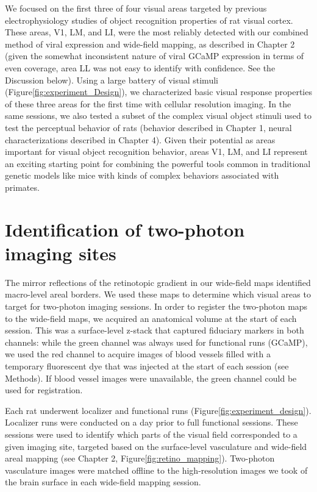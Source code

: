 We focused on the first three of four visual areas targeted by previous electrophysiology studies of object recognition properties of rat visual cortex. These areas, V1, LM, and LI, were the most reliably detected with our combined method of viral expression and wide-field mapping, as described in Chapter 2 (given the somewhat inconsistent nature of viral GCaMP expression in terms of even coverage, area LL was not easy to identify with confidence. See the Discussion below). Using a large battery of visual stimuli (Figure\ref{fig:experiment_Design}), we characterized basic visual response properties of these three areas for the first time with cellular resolution imaging. In the same sessions, we also tested a subset of the complex visual object stimuli used to test the perceptual behavior of rats (behavior described in Chapter 1, neural characterizations described in Chapter 4). Given their potential as areas important for visual object recognition behavior, areas V1, LM, and LI  represent an exciting starting point for combining the powerful tools common in traditional genetic models like mice with kinds of complex behaviors associated with primates.  

\section{Identification of two-photon imaging sites}
The mirror reflections of the retinotopic gradient in our wide-field maps identified macro-level areal borders. We used these maps to determine which visual areas to target for two-photon imaging sessions. In order to register the two-photon maps to the wide-field maps, we acquired an anatomical volume at the start of each session. This was a surface-level z-stack that captured fiduciary markers in both channels: while the green channel was always used for functional runs (GCaMP), we used the red channel to acquire images of blood vessels filled with a temporary fluorescent dye that was injected at the start of each session (see Methods). If blood vessel images were unavailable, the green channel could be used for registration. 

Each rat underwent localizer and functional runs (Figure\ref{fig:experiment_design}). Localizer runs were conducted on a day prior to full functional sessions. These sessions were used to identify which parts of the visual field corresponded to a given imaging site, targeted based on the surface-level vasculature and wide-field areal mapping (see Chapter 2, Figure\ref{fig:retino_mapping}). Two-photon vasculature images were matched offline to the high-resolution images we took of the brain surface in each wide-field mapping session.

